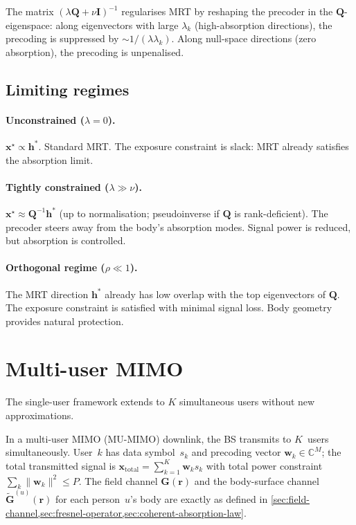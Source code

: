 \documentclass[11pt,a4paper]{article}
\theoremstyle{definition}      %
\begin{document}
The matrix $(\lambda\mathbf{Q}+\nu\mathbf{I})^{-1}$ regularises MRT
by reshaping the precoder in the $\mathbf{Q}$-eigenspace: along
eigenvectors with large $\lambda_k$ (high-absorption directions), the
precoding is suppressed by $\sim 1/(\lambda\lambda_k)$.  Along null-space
directions (zero absorption), the precoding is unpenalised.

\subsection{Limiting regimes}\label{sec:ecbf-limits}

\paragraph{Unconstrained ($\lambda = 0$).} $\mathbf{x}^\star \propto \mathbf{h}^*$.
Standard MRT.  The exposure constraint is slack: MRT already satisfies
the absorption limit.

\paragraph{Tightly constrained ($\lambda \gg \nu$).}
$\mathbf{x}^\star \approx \mathbf{Q}^{-1}\mathbf{h}^*$ (up to normalisation;
pseudoinverse if $\mathbf{Q}$ is rank-deficient).  The precoder steers
away from the body's absorption modes.  Signal power is reduced, but
absorption is controlled.

\paragraph{Orthogonal regime ($\rho \ll 1$).} The MRT direction
$\mathbf{h}^*$ already has low overlap with the top eigenvectors of
$\mathbf{Q}$.  The exposure constraint is satisfied with minimal
signal loss.  Body geometry provides natural protection.


\section{Multi-user MIMO}\label{sec:mu-mimo}

The single-user framework extends to $K$ simultaneous users without
new approximations.

In a multi-user MIMO (MU-MIMO) downlink, the BS transmits to
$K$~users simultaneously.  User~$k$ has data symbol~$s_k$ and
precoding vector $\mathbf{w}_k \in \mathbb{C}^M$; the total
transmitted signal is
$\mathbf{x}_\mathrm{total} = \sum_{k=1}^K \mathbf{w}_k s_k$
with total power constraint $\sum_k\|\mathbf{w}_k\|^2 \leq P$.
The field channel $\mathbf{G}(\mathbf{r})$ and the body-surface
channel $\tilde{\mathbf{G}}^{(u)}(\mathbf{r})$ for each
person~$u$'s body are exactly as defined in
\cref{sec:field-channel,sec:fresnel-operator,sec:coherent-absorption-law}.
\end{document}

